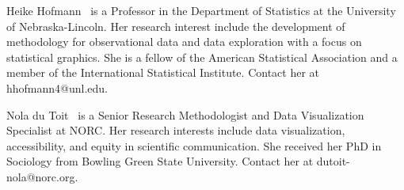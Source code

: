 \documentclass{IEEEcsmag}
\begin{document}
\begin{IEEEbiography}{Heike Hofmann} {\,} is a Professor in the Department of Statistics at the University of Nebraska-Lincoln.  Her research interest include the development of methodology for observational data and data exploration with a focus on statistical graphics. She is a fellow of the American Statistical Association and a member of the International Statistical Institute. Contact her at hhofmann4@unl.edu.
\end{IEEEbiography}


\begin{IEEEbiography}{Nola du Toit} {\,} is a Senior Research Methodologist and Data Visualization Specialist at NORC. Her research interests include data visualization, accessibility, and equity in scientific communication. She received her PhD in Sociology from Bowling Green State University. Contact her at dutoit-nola@norc.org.
\end{IEEEbiography}
\end{document}

